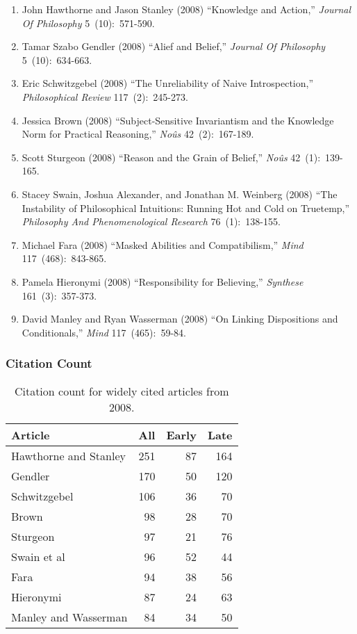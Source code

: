 \documentclass[
  10pt,
  letterpaper,
  DIV=11,
  numbers=noendperiod,
  twoside]{scrartcl}
\providecommand{\tightlist}{%
  \setlength{\itemsep}{0pt}\setlength{\parskip}{0pt}}\usepackage{longtable,booktabs,array}
\begin{document}
\begin{enumerate}
\def\labelenumi{\arabic{enumi}.}
\tightlist
\item
  John Hawthorne and Jason Stanley (2008) ``Knowledge and Action,''
  \emph{Journal Of Philosophy} 5~(10):~571-590.
\item
  Tamar Szabo Gendler (2008) ``Alief and Belief,'' \emph{Journal Of
  Philosophy} 5~(10):~634-663.
\item
  Eric Schwitzgebel (2008) ``The Unreliability of Naive Introspection,''
  \emph{Philosophical Review} 117~(2):~245-273.
\item
  Jessica Brown (2008) ``Subject-Sensitive Invariantism and the
  Knowledge Norm for Practical Reasoning,'' \emph{Noûs} 42~(2):~167-189.
\item
  Scott Sturgeon (2008) ``Reason and the Grain of Belief,'' \emph{Noûs}
  42~(1):~139-165.
\item
  Stacey Swain, Joshua Alexander, and Jonathan M. Weinberg (2008) ``The
  Instability of Philosophical Intuitions: Running Hot and Cold on
  Truetemp,'' \emph{Philosophy And Phenomenological Research}
  76~(1):~138-155.
\item
  Michael Fara (2008) ``Masked Abilities and Compatibilism,''
  \emph{Mind} 117~(468):~843-865.
\item
  Pamela Hieronymi (2008) ``Responsibility for Believing,''
  \emph{Synthese} 161~(3):~357-373.
\item
  David Manley and Ryan Wasserman (2008) ``On Linking Dispositions and
  Conditionals,'' \emph{Mind} 117~(465):~59-84.
\end{enumerate}

\subsubsection*{Citation Count}\label{sec-count-2008}

\begin{longtable}[]{@{}lrrr@{}}

\caption{\label{tbl-citation-count-2008}Citation count for widely cited
articles from 2008.}

\tabularnewline

\toprule\noalign{}
Article & All & Early & Late \\
\midrule\noalign{}
\endhead
\bottomrule\noalign{}
\endlastfoot
Hawthorne and Stanley & 251 & 87 & 164 \\
Gendler & 170 & 50 & 120 \\
Schwitzgebel & 106 & 36 & 70 \\
Brown & 98 & 28 & 70 \\
Sturgeon & 97 & 21 & 76 \\
Swain et al & 96 & 52 & 44 \\
Fara & 94 & 38 & 56 \\
Hieronymi & 87 & 24 & 63 \\
Manley and Wasserman & 84 & 34 & 50 \\

\end{longtable}
\end{document}
